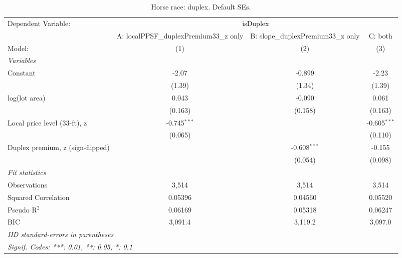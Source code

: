 
\begin{table}[htbp]
   \caption{\label{tab:horseRace_duplex_default} Horse race: duplex. Default SEs.}
   \centering
   \begin{tabular}{lccc}
      \tabularnewline \midrule \midrule
      Dependent Variable: & \multicolumn{3}{c}{isDuplex}\\
                                       & A: localPPSF\_duplexPremium33\_z only   & B: slope\_duplexPremium33\_z only   & C: both \\   
      Model:                           & (1)                                     & (2)                                 & (3)\\  
      \midrule
      \emph{Variables}\\
      Constant                         & -2.07                                   & -0.899                              & -2.23\\   
                                       & (1.39)                                  & (1.34)                              & (1.39)\\   
      log(lot area)                    & 0.043                                   & -0.090                              & 0.061\\   
                                       & (0.163)                                 & (0.158)                             & (0.163)\\   
      Local price level (33-ft), z     & -0.745$^{***}$                          &                                     & -0.605$^{***}$\\   
                                       & (0.065)                                 &                                     & (0.110)\\   
      Duplex premium, z (sign-flipped) &                                         & -0.608$^{***}$                      & -0.155\\   
                                       &                                         & (0.054)                             & (0.098)\\   
      \midrule
      \emph{Fit statistics}\\
      Observations                     & 3,514                                   & 3,514                               & 3,514\\  
      Squared Correlation              & 0.05396                                 & 0.04560                             & 0.05520\\  
      Pseudo R$^2$                     & 0.06169                                 & 0.05318                             & 0.06247\\  
      BIC                              & 3,091.4                                 & 3,119.2                             & 3,097.0\\  
      \midrule \midrule
      \multicolumn{4}{l}{\emph{IID standard-errors in parentheses}}\\
      \multicolumn{4}{l}{\emph{Signif. Codes: ***: 0.01, **: 0.05, *: 0.1}}\\
   \end{tabular}
\end{table}


